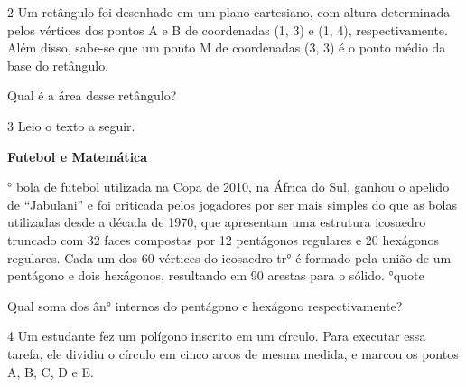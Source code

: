 {{{\begin{escolha}
{{{{{\begin{escolha}
\begin{escolha}
{

\num{2} Um retângulo foi desenhado em um plano cartesiano, com altura
determinada pelos vértices dos pontos A e B de coordenadas (1, 3) e (1,
4), respectivamente. Além disso, sabe-se que um ponto M de
coordenadas (3, 3) é o ponto médio da base do retângulo.

Qual é a área desse retângulo?



\num{3} Leio o texto a seguir.

\begin{q°}
\textbf{Futebol e Matemática}

° bola de futebol utilizada na Copa de 2010, na África do Sul, ganhou o
apelido de ``Jabulani'' e foi criticada pelos jogadores por ser mais
simples do que as bolas utilizadas desde a década de 1970, que
apresentam uma estrutura icosaedro truncado com 32 faces compostas por
12 pentágonos regulares e 20 hexágonos regulares. Cada um dos 60
vértices do icosaedro tr° é formado pela união de um pentágono e
dois hexágonos, resultando em 90 arestas para o sólido.
\e°{quote}

Qual soma dos ân° internos do pentágono e hexágono respectivamente?



\num{4} Um estudante fez um polígono inscrito em um círculo. Para executar
essa tarefa, ele dividiu o círculo em cinco arcos de mesma medida, e
marcou os pontos A, B, C, D e E.


\end{q°}}
\end{escolha}
\end{escolha}}}}}}
\end{escolha}}}}

